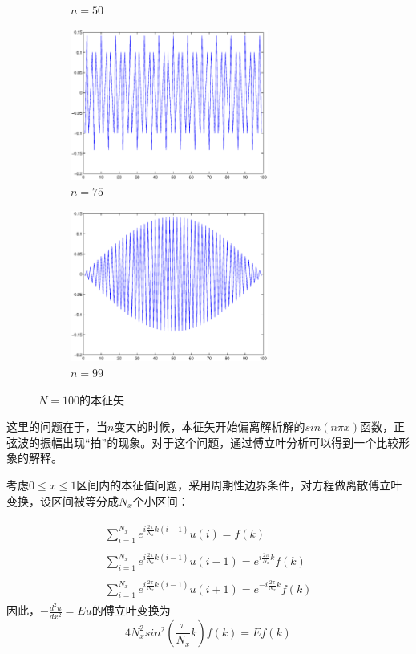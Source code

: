 \documentclass[paper=a4, fontsize=11pt]{scrartcl} %
\numberwithin{equation}{section} %
\numberwithin{figure}{section} %
\numberwithin{table}{section} %
\begin{document}
\begin{CJK*}{UTF8}{gbsn}
\begin{figure}[H]
\begin{subfigure}{70mm}
  \caption{$n=50$}
  \label{fig:sub2}
\end{subfigure}
\begin{subfigure}{70mm}
  \centering
  \includegraphics[width=65mm]{figure-1-2-6.eps}
  \caption{$n=75$}
  \label{fig:sub2}
\end{subfigure}
\begin{subfigure}{70mm}
  \centering
  \includegraphics[width=65mm]{figure-1-2-7.eps}
  \caption{$n=99$}
  \label{fig:sub2}
\end{subfigure}
\caption{$N=100$的本征矢}
\label{fig:test}
\end{figure}
这里的问题在于，当$n$变大的时候，本征矢开始偏离解析解的$sin(n\pi x)$函数，正弦波的振幅出现“拍”的现象。对于这个问题，通过傅立叶分析可以得到一个比较形象的解释。

考虑$0 \leq x \leq 1$区间内的本征值问题，采用周期性边界条件，对方程做离散傅立叶变换，设区间被等分成$N_x$个小区间：

\begin{align}
\begin{split}
\sum_{i=1}^{N_x}e^{i\frac{2\pi}{N_x}k(i-1)}u(i) =  f(k) \\\\
\sum_{i=1}^{N_x}e^{i\frac{2\pi}{N_x}k(i-1)}u(i-1) = e^{i\frac{2\pi}{N_x}k} f(k) \\\\
\sum_{i=1}^{N_x}e^{i\frac{2\pi}{N_x}k(i-1)}u(i+1) = e^{-i\frac{2\pi}{N_x}k} f(k)
\end{split}
\end{align}
因此，$-\frac{d^2u}{dx^2}=Eu$的傅立叶变换为
\begin{equation}
4N_x^2sin^2(\frac{\pi}{N_x}k) f(k) = Ef(k)
\end{equation}


\end{CJK*}
\end{document}

